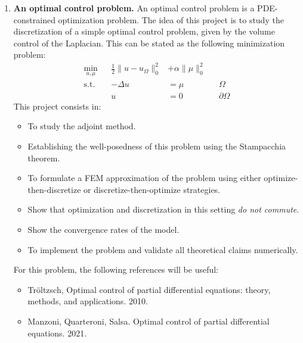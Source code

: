 \documentclass{article}
\begin{document}
\begin{enumerate}
    \item \textbf{An optimal control problem.} An optimal control problem is a PDE-constrained optimization problem. The idea of this project is to study the discretization of a simple optimal control problem, given by the volume control of the Laplacian. This can be stated as the following minimization problem: 
        $$ \begin{aligned} \min_{u,\mu} && \frac 1 2 \|u - u_\Omega\|_0^2 &+ \alpha \|\mu\|_0^2 && \\
            \text{s.t.} && -\Delta u &= \mu &&  \Omega \\
                        && u &= 0 && \partial\Omega
        \end{aligned} $$
        This project consists in:
        \begin{itemize}
            \item To study the adjoint method.
            \item Establishing the well-posedness of this problem using the Stampacchia theorem.
            \item To formulate a FEM approximation of the problem using either optimize-then-discretize or discretize-then-optimize strategies.
            \item Show that optimization and discretization in this setting \emph{do not commute}.
            \item Show the convergence rates of the model.
            \item To implement the problem and validate all theoretical claims numerically.
        \end{itemize}
        For this problem, the following references will be useful: 
        \begin{itemize}
            \item Tröltzsch, Optimal control of partial differential equations: theory, methods, and applications. 2010.
            \item Manzoni, Quarteroni, Salsa. Optimal control of partial differential equations. 2021.
        \end{itemize}


\end{enumerate}
\end{document}
